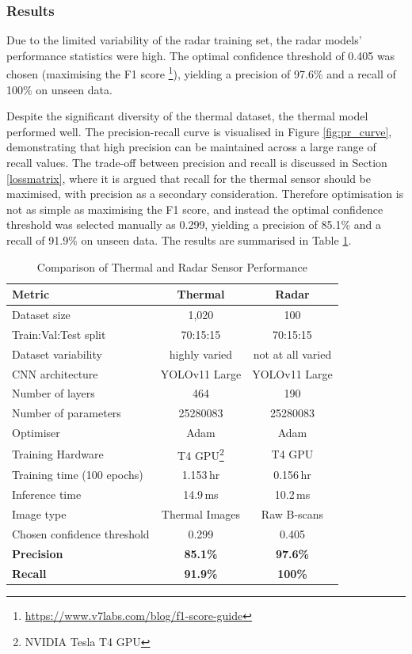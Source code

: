 \subsubsection{Results} \label{sec:cv_results_comparison}

Due to the limited variability of the radar training set, the radar models' performance statistics were high. The optimal confidence threshold of 0.405 was chosen (maximising the F1 score \footnote{\url{https://www.v7labs.com/blog/f1-score-guide}}), yielding a precision of 97.6\% and a recall of 100\% on unseen data.

Despite the significant diversity of the thermal dataset, the thermal model performed well. The precision-recall curve is visualised in Figure \ref{fig:pr_curve}, demonstrating that high precision can be maintained across a large range of recall values. The trade-off between precision and recall is discussed in Section \ref{lossmatrix}, where it is argued that recall for the thermal sensor should be maximised, with precision as a secondary consideration. Therefore optimisation is not as simple as maximising the F1 score, and instead the optimal confidence threshold was selected manually as 0.299, yielding a precision of 85.1\% and a recall of 91.9\% on unseen data. The results are summarised in Table \ref{tab:sensor_comparison}.

\begin{table}[htbp]
\centering
\begin{tabular}{lcc}
\hline
\textbf{Metric} & \textbf{Thermal} & \textbf{Radar} \\ 
\hline
Dataset size & 1,020 & 100 \\
Train:Val:Test split & 70:15:15 & 70:15:15 \\
Dataset variability & highly varied & not at all varied \\
CNN architecture & YOLOv11 Large & YOLOv11 Large \\
Number of layers & 464 & 190 \\
Number of parameters & 25280083 & 25280083 \\
Optimiser & Adam & Adam \\
Training Hardware & T4 GPU\footnote{\label{ftn:t4gpu}NVIDIA Tesla T4 GPU} & T4 GPU\\
Training time (100 epochs) & 1.153\,hr & 0.156\,hr \\
Inference time & 14.9\,ms & 10.2\,ms \\
Image type & Thermal Images & Raw B-scans \\
Chosen confidence threshold & 0.299 & 0.405 \\
\hline
\rowcolor{gray!10} \textbf{Precision} & \textbf{85.1\%} & \textbf{97.6\%} \\
\rowcolor{gray!10} \textbf{Recall} & \textbf{91.9\%} & \textbf{100\%} \\
\hline
\end{tabular}
\caption{Comparison of Thermal and Radar Sensor Performance}
\label{tab:sensor_comparison}
\end{table}



